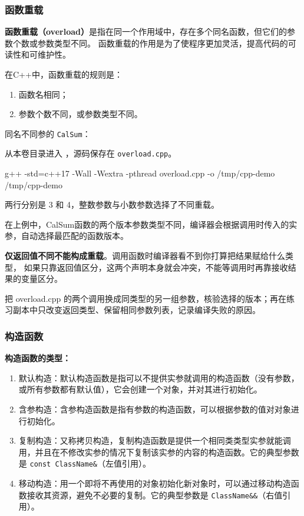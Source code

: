 \subsubsection{函数重载}
\textbf{函数重载（overload）}是指在同一个作用域中，存在多个同名函数，但它们的参数个数或参数类型不同。
函数重载的作用是为了使程序更加灵活，提高代码的可读性和可维护性。

在C++中，函数重载的规则是：
\begin{enumerate}
    \item 函数名相同；
    \item 参数个数不同，或参数类型不同。
\end{enumerate}

\begin{example}
同名不同参的 \texttt{CalSum}：



从本卷目录进入 ，源码保存在 \texttt{overload.cpp}。
\begin{tbash}
g++ -std=c++17 -Wall -Wextra -pthread overload.cpp -o /tmp/cpp-demo
/tmp/cpp-demo
\end{tbash}
两行分别是 3 和 4，整数参数与小数参数选择了不同重载。
\end{example}

在上例中，CalSum函数的两个版本参数类型不同，编译器会根据调用时传入的实参，自动选择最匹配的函数版本。

\begin{note}
\textbf{仅返回值不同不能构成重载}。调用函数时编译器看不到你打算把结果赋给什么类型，
如果只靠返回值区分，这两个声明本身就会冲突，不能等调用时再靠接收结果的变量区分。
\end{note}

\begin{exercise}
\label{ex:v1-cpp-overload}
把 overload.cpp 的两个调用换成同类型的另一组参数，核验选择的版本；再在练习副本中只改变返回类型、保留相同参数列表，记录编译失败的原因。
\end{exercise}

\subsubsection{构造函数}

\textbf{构造函数的类型：}

\begin{enumerate}
    \item 默认构造：默认构造函数是指可以不提供实参就调用的构造函数（没有参数，或所有参数都有默认值），它会创建一个对象，并对其进行初始化。
    \item 含参构造：含参构造函数是指有参数的构造函数，可以根据参数的值对对象进行初始化。
    \item 复制构造：又称拷贝构造，复制构造函数是提供一个相同类类型实参就能调用，并且在不修改实参的情况下复制该实参的内容的构造函数。它的典型参数是 \texttt{const ClassName\&}（左值引用）。
    \item 移动构造：用一个即将不再使用的对象初始化新对象时，可以通过移动构造函数接收其资源，避免不必要的复制。它的典型参数是 \texttt{ClassName\&\&}（右值引用）。
\end{enumerate}

